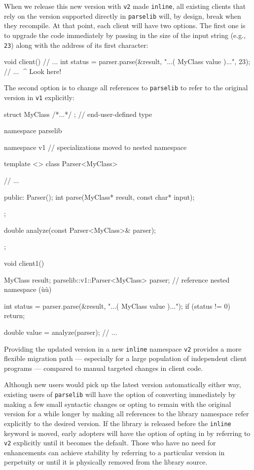 \noindent When we release this new version with \lstinline!v2! made \lstinline!inline!,
all existing clients that rely on the version supported directly in
\lstinline!parselib! will, by design, break when they recompile. At
that point, each client will have two options. The first one is
to upgrade the code immediately by passing in the size of the input
string (e.g., \lstinline!23!) along with the address of its first
character:

\begin{emcppslisting}[emcppserrorlines={4}]
void client()
{
    // ...
    int status = parser.parse(&result, "...( MyClass value )...", 23);
    // ...                                                      ^^^^ Look here!
}
\end{emcppslisting}

\noindent The second option is to change all references to
\lstinline!parselib! to refer to the original version in \lstinline!v1!
explicitly:

\begin{emcppshiddenlisting}[emcppsbatch=e3]
struct MyClass { /*...*/ };  // end-user-defined type
\end{emcppshiddenlisting}
\begin{emcppslisting}[emcppsbatch=e3]
namespace parselib
{
    namespace v1  // specializations moved to nested namespace
    {
        template <>
        class Parser<MyClass>
        {
            // ...

        public:
            Parser();
            int parse(MyClass* result, const char* input);
        };

        double analyze(const Parser<MyClass>& parser);
    }
};

void client1()
{
    MyClass result;
    parselib::v1::Parser<MyClass> parser;  // reference nested namespace (ù{}ù)

    int status = parser.parse(&result, "...( MyClass value )...");
    if (status != 0)
    {
        return;
    }

    double value = analyze(parser);
    // ...
}
\end{emcppslisting}

\noindent Providing the updated version in a new \lstinline!inline! namespace
\lstinline!v2! provides a more flexible migration path --- especially for a
large population of independent client programs --- compared to manual
targeted changes in client code.

Although new users would pick up the latest version automatically either
way, existing users of \lstinline!parselib! will have the option of
converting immediately by making a few small syntactic changes or
opting to remain with the original version for a while longer by making
all references to the library namespace refer explicitly to the desired
version. If the library is released before the \lstinline!inline! keyword
is moved, early adopters will have the option of opting in by referring
to \lstinline!v2! explicitly until it becomes the default. Those who have
no need for enhancements can achieve stability by referring to a
particular version in perpetuity or until it is physically removed from
the library source.

